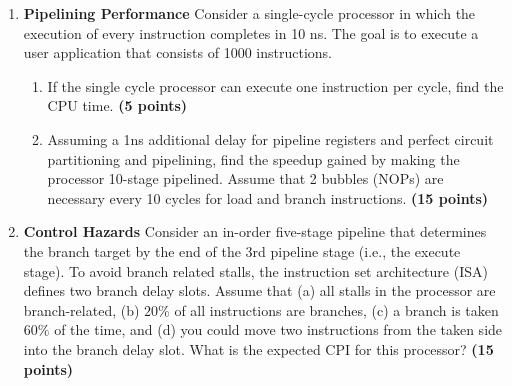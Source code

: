 \documentclass[a4paper, 11pt]{exam}
\begin{document}
\begin{enumerate}
	\item \textbf {Pipelining Performance}
    Consider a single-cycle processor in which the execution of
every instruction completes in 10 ns. The goal is to execute a user application that consists of 1000 instructions.
	\begin{enumerate}
    \item If the single cycle processor can execute one instruction per cycle, find the CPU time. \textbf{(5 points)}
    
    \newline
    
   
    \item Assuming a 1ns additional delay for pipeline registers and perfect circuit partitioning and pipelining, find the speedup gained by making the processor 10-stage pipelined. Assume that 2 bubbles (NOPs) are necessary every 10 cycles for load and branch instructions. \textbf{(15 points)}
    
	\newline
    
	\end{enumerate}
    
    \item \textbf{Control Hazards} Consider an in-order five-stage pipeline that determines the branch
target by the end of the 3rd pipeline stage (i.e., the execute stage). To avoid branch related stalls, the instruction set architecture (ISA) defines two branch delay slots. Assume that (a) all stalls in the processor are branch-related, (b) $20\%$ of all instructions are branches, (c) a branch is taken $60\%$ of the time, and (d) you could move two instructions from the taken side into the branch delay slot. What is the expected CPI for
this processor? \textbf{(15 points)} 

\end{enumerate}
\end{document}
